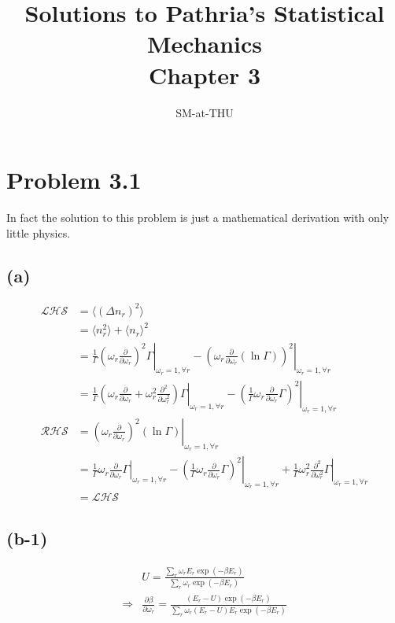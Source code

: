 \documentclass{article}
\author{SM-at-THU}
\title{\bf{Solutions to Pathria's Statistical Mechanics}\\Chapter 3}
\begin{document}
\maketitle


\section*{Problem 3.1}
In fact the solution to this problem is just a mathematical derivation with only little physics.
\subsection*{(a)}
    \begin{align}
    \mathcal{LHS}&=\langle \left( \Delta n_r \right)^2 \rangle  \\
    &=\langle n_r^2 \rangle +\langle n_r \rangle^2\\
    &=\left. \frac{1}{\Gamma}\left( \omega_r \frac{\partial}{\partial \omega_r } \right)^2\Gamma \right|_{\omega_r=1,\forall r}
    - \left. \left(   \omega_r \frac{\partial}{\partial \omega_r }  \left(\ln \Gamma \right)  \right)^2 \right|_{\omega_r=1,\forall r}\\
    &= \left. \frac{1}{\Gamma} \left( \omega_r \frac{\partial}{\partial \omega_r } + \omega_r^2 \frac{\partial^2}{\partial \omega_r^2} \right)\Gamma \right|_{\omega_r=1,\forall r}
    - \left. \left( \frac{1}{\Gamma}   \omega_r \frac{\partial}{\partial \omega_r } \Gamma \right)^2 \right|_{\omega_r=1,\forall r}\\
    \mathcal{RHS}&=\left. \left( \omega_r \frac{\partial}{\partial \omega_r } \right)^2\left(\ln \Gamma \right)  \right|_{\omega_r=1,\forall r}\\
    &= \left. \frac{1}{\Gamma}  \omega_r \frac{\partial}{\partial \omega_r }\Gamma \right|_{\omega_r=1,\forall r}
    - \left. \left( \frac{1}{\Gamma}   \omega_r \frac{\partial}{\partial \omega_r } \Gamma \right)^2 \right|_{\omega_r=1,\forall r}
    +\left. \frac{1}{\Gamma}\omega_r^2 \frac{\partial^2}{\partial \omega_r^2} \Gamma \right|_{\omega_r=1,\forall r}\\
    &=\mathcal{LHS}
    \end{align}
\subsection*{(b-1)}
    \begin{align}
    & U=\frac{\sum_r\omega_r E_r \exp{(-\beta E_r)}}{\sum_r\omega_r \exp{(-\beta E_r)}}\\
    \Rightarrow& \frac{\partial\beta}{\partial\omega_r}= \frac{(E_r-U)\exp{(-\beta E_r)}} {\sum_r\omega_r (E_r-U) E_r \exp{(-\beta E_r)}}
    \end{align}
\end{document}

